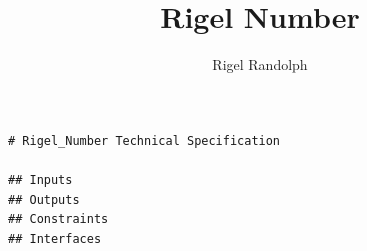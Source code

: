 \documentclass[11pt]{article}
\title{Rigel Number}
\author{Rigel Randolph}
\date{}
\begin{document}
\maketitle

\begin{verbatim}
# Rigel_Number Technical Specification

## Inputs
## Outputs
## Constraints
## Interfaces

\end{verbatim}
\end{document}
